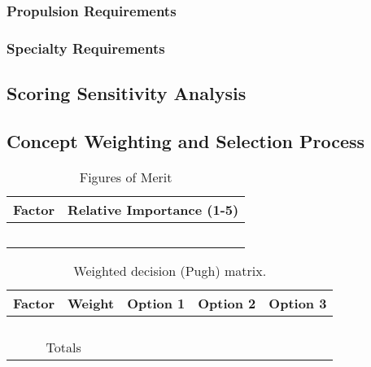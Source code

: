 \documentclass[report]{byu-aero}
\begin{document}
\subsubsection{Propulsion Requirements}
\label{sssec:propreqs}


\subsubsection{Specialty Requirements} %
\label{sssec:specialreqs}



\subsection{Scoring Sensitivity Analysis}
\label{ssec:scoringsensitivity}



\subsection{Concept Weighting and Selection Process}
\label{ssec:selectionprocess}


\begin{table}[h!]
	\centering
	\caption{Figures of Merit}
	\label{tab:fom}
	\begin{tabular}{ |c|c| } 
		\hline
		\rowcolor{BYUbluemid}
    	Factor & Relative Importance (1-5) \\ 
		\hline
	     &  \\ 
		\hline
		 &  \\ 
		\hline
		 &  \\ 
		\hline
		 &  \\ 
		\hline
		 &  \\ 
		\hline
	\end{tabular}
\end{table}



\begin{table}[h!]
	\centering
	\caption{Weighted decision (Pugh) matrix.}
	\label{tab:decisionmatrix1}
	\begin{tabular}{ |c|c|c|c|c| } 
		\hline
		\rowcolor{BYUbluemid}
    	Factor & Weight & Option 1 & Option 2 & Option 3 \\ 
		\hline
	     &  &  &  &  \\ 
		\hline
		 &  &  &  &  \\ 
		\hline
		 &  &  &  &  \\ 
		\hline
		 &  &  &  &  \\ 
		\hline
		\multicolumn{2}{|c|}{Totals} &  &  &  \\ %
		\hline
	\end{tabular}
\end{table}
\end{document}
